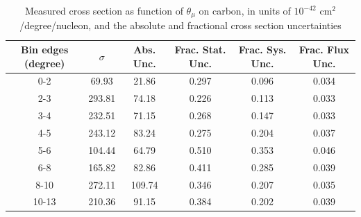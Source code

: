 \documentclass[../main.tex]{subfiles}
\begin{document}
\begin{table}
  \centering
  \renewcommand{\arraystretch}{1.15}
  \caption{Systematic covariance matrix of measured cross section in $p_{\mu}$ on carbon, in units of $10^{-84}$ $(\text{cm}^2$/GeV/c/nucleon$)^2$}
  \label{tbl:sysnucleonnuc6muon_pc}
\end{table}
\pagebreak
\begin{turnpage}
\end{turnpage}
\begin{table}
  \centering
  \renewcommand{\arraystretch}{1.15}
  \caption{Measured cross section as function of $\theta_{\mu}$ on carbon, in units of $10^{-42}$ $\text{cm}^2$/degree/nucleon, and the absolute and fractional cross section uncertainties}
    \begin{tabular}{c||c|c||c|c|c}
      Bin edges (degree) &  $\sigma$  &  Abs. Unc.  &  Frac. Stat. Unc.  &  Frac. Sys. Unc.  &  Frac. Flux Unc. \\
      \hline
      \hline
      0-2 & 69.93 & 21.86 & 0.297 & 0.096 & 0.034\\
      2-3 & 293.81 & 74.18 & 0.226 & 0.113 & 0.033\\
      3-4 & 232.51 & 71.15 & 0.268 & 0.147 & 0.033\\
      4-5 & 243.12 & 83.24 & 0.275 & 0.204 & 0.037\\
      5-6 & 104.44 & 64.79 & 0.510 & 0.353 & 0.046\\
      6-8 & 165.82 & 82.86 & 0.411 & 0.285 & 0.039\\
      8-10 & 272.11 & 109.74 & 0.346 & 0.207 & 0.035\\
      10-13 & 210.36 & 91.15 & 0.384 & 0.202 & 0.039
    \end{tabular}
  \label{tbl:datanucleonnuc6muon_thetaa}
\end{table}
\end{document}
